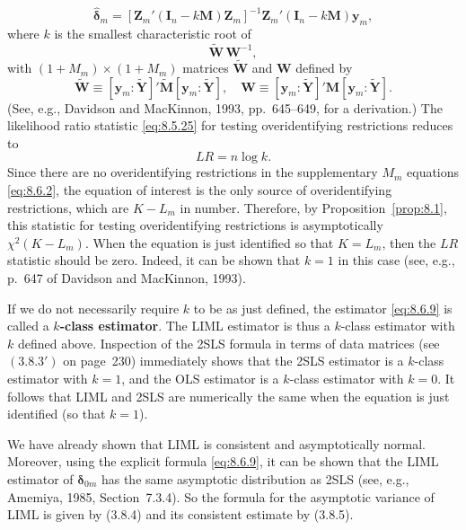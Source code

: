 \begin{equation}
  \hat{\boldsymbol{\delta}}_m
  = [\mathbf{Z}_m'(\mathbf{I}_n - k\mathbf{M})\mathbf{Z}_m]^{-1}
    \mathbf{Z}_m'(\mathbf{I}_n - k\mathbf{M})\mathbf{y}_m,
  \label{eq:8.6.9} \tag{8.6.9}
\end{equation}
where $k$ is the smallest characteristic root of
\begin{equation}
  \tilde{\mathbf{W}}\,\mathbf{W}^{-1},
  \label{eq:8.6.10} \tag{8.6.10}
\end{equation}
with $(1 + M_m) \times (1 + M_m)$ matrices $\tilde{\mathbf{W}}$ and $\mathbf{W}$ defined by
\begin{equation}
  \tilde{\mathbf{W}}
  \equiv [\mathbf{y}_m : \tilde{\mathbf{Y}}]'\tilde{\mathbf{M}}
    [\mathbf{y}_m : \tilde{\mathbf{Y}}], \quad
  \mathbf{W}
  \equiv [\mathbf{y}_m : \tilde{\mathbf{Y}}]'\mathbf{M}
    [\mathbf{y}_m : \tilde{\mathbf{Y}}].
  \label{eq:8.6.11} \tag{8.6.11}
\end{equation}
(See, e.g., Davidson and MacKinnon, 1993, pp.~645--649, for a derivation.) The
likelihood ratio statistic \eqref{eq:8.5.25} for testing overidentifying restrictions reduces to
\begin{equation}
  LR = n \log k.
  \label{eq:8.6.12} \tag{8.6.12}
\end{equation}
Since there are no overidentifying restrictions in the supplementary $M_m$ equations
\eqref{eq:8.6.2}, the equation of interest is the only source of overidentifying restrictions,
which are $K - L_m$ in number. Therefore, by Proposition~\ref{prop:8.1}, this statistic for testing
overidentifying restrictions is asymptotically $\chi^2(K - L_m)$. When the equation is
just identified so that $K = L_m$, then the $LR$ statistic should be zero. Indeed, it can
be shown that $k = 1$ in this case (see, e.g., p.~647 of Davidson and MacKinnon,
1993).

If we do not necessarily require $k$ to be as just defined, the estimator \eqref{eq:8.6.9} is
called a \textbf{$k$-class estimator}. The LIML estimator is thus a $k$-class estimator with
$k$ defined above. Inspection of the 2SLS formula in terms of data matrices (see
$(3.8.3')$ on page~230) immediately shows that the 2SLS estimator is a $k$-class estimator with $k = 1$, and the OLS estimator is a $k$-class estimator with $k = 0$. It
follows that LIML and 2SLS are numerically the same when the equation is just
identified (so that $k = 1$).

We have already shown that LIML is consistent and asymptotically normal.
Moreover, using the explicit formula \eqref{eq:8.6.9}, it can be shown that the LIML estimator of $\boldsymbol{\delta}_{0m}$ has the same asymptotic distribution as 2SLS (see, e.g., Amemiya,
1985, Section~7.3.4). So the formula for the asymptotic variance of LIML is given
by (3.8.4) and its consistent estimate by (3.8.5).


